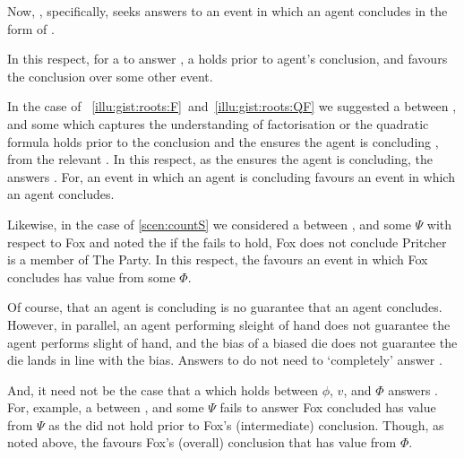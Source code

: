 \begin{note}
  Now, \qWhy{}, specifically, seeks answers to an event in which an agent concludes in the form of .

  In this respect, for a \ros{} to answer \qWhy{}, a \ros{} holds prior to agent's conclusion, and favours the conclusion over some other event.

  In the case of ~\ref{illu:gist:roots:F}~and~\ref{illu:gist:roots:QF} we suggested a \ros{} between \propM{\rootsCon{}},  and some \pool{} which captures the \agents{} understanding of factorisation or the quadratic formula holds prior to the \agents{} conclusion and the \ros{} ensures the agent is concluding \propM{\rootsCon{}},  from the relevant \pool{}.
  In this respect, as the \ros{} ensures the agent is concluding, the \ros{} answers \qWhy{}.
  For, an event in which an agent is concluding favours an event in which an agent concludes.

  Likewise, in the case of \autoref{scen:countS} we considered a \ros{} between ,  and some \pool{} \(\Psi\) with respect to Fox and noted the if the \ros{} fails to hold, Fox does not conclude Pritcher is a member of The Party.
  In this respect, the \ros{} favours an event in which Fox concludes  has value  from some \pool{} \(\Phi\).

  Of course, that an agent is concluding is no guarantee that an agent concludes.
  However, in parallel, an agent performing sleight of hand does not guarantee the agent performs slight of hand, and the bias of a biased die does not guarantee the die lands in line with the bias.
  Answers to \qWhy{} do not need to `completely' answer \qWhy{}.

  And, it need not be the case that a \ros{} which holds between \(\phi\), \(v\), and \(\Phi\) answers \qWhy{}.
  For, example, a \ros{} between ,  and some \pool{} \(\Psi\) fails to answer \qWhy{} Fox concluded  has value  from \(\Psi\) as the \ros{} did not hold prior to Fox's (intermediate) conclusion.
  Though, as noted above, the \ros{} favours Fox's (overall) conclusion that  has value  from \(\Phi\).
\end{note}



